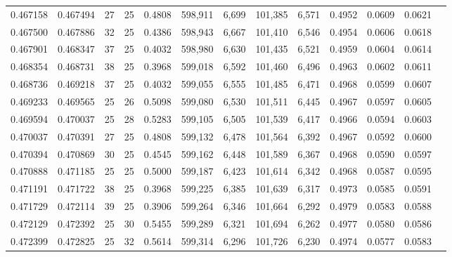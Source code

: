 \begin{tabular}{rrrrrrrrrrrrr}
0.467158 & 0.467494 &    27 &  25 &                                     0.4808 & 598,911 &   6,699 & 101,385 &   6,571 & 0.4952 & 0.0609 & 0.0621 \\
0.467500 & 0.467886 &    32 &  25 &                                     0.4386 & 598,943 &   6,667 & 101,410 &   6,546 & 0.4954 & 0.0606 & 0.0618 \\
0.467901 & 0.468347 &    37 &  25 &                                     0.4032 & 598,980 &   6,630 & 101,435 &   6,521 & 0.4959 & 0.0604 & 0.0614 \\
0.468354 & 0.468731 &    38 &  25 &                                     0.3968 & 599,018 &   6,592 & 101,460 &   6,496 & 0.4963 & 0.0602 & 0.0611 \\
0.468736 & 0.469218 &    37 &  25 &                                     0.4032 & 599,055 &   6,555 & 101,485 &   6,471 & 0.4968 & 0.0599 & 0.0607 \\
0.469233 & 0.469565 &    25 &  26 &                                     0.5098 & 599,080 &   6,530 & 101,511 &   6,445 & 0.4967 & 0.0597 & 0.0605 \\
0.469594 & 0.470037 &    25 &  28 &                                     0.5283 & 599,105 &   6,505 & 101,539 &   6,417 & 0.4966 & 0.0594 & 0.0603 \\
0.470037 & 0.470391 &    27 &  25 &                                     0.4808 & 599,132 &   6,478 & 101,564 &   6,392 & 0.4967 & 0.0592 & 0.0600 \\
0.470394 & 0.470869 &    30 &  25 &                                     0.4545 & 599,162 &   6,448 & 101,589 &   6,367 & 0.4968 & 0.0590 & 0.0597 \\
0.470888 & 0.471185 &    25 &  25 &                                     0.5000 & 599,187 &   6,423 & 101,614 &   6,342 & 0.4968 & 0.0587 & 0.0595 \\
0.471191 & 0.471722 &    38 &  25 &                                     0.3968 & 599,225 &   6,385 & 101,639 &   6,317 & 0.4973 & 0.0585 & 0.0591 \\
0.471729 & 0.472114 &    39 &  25 &                                     0.3906 & 599,264 &   6,346 & 101,664 &   6,292 & 0.4979 & 0.0583 & 0.0588 \\
0.472129 & 0.472392 &    25 &  30 &                                     0.5455 & 599,289 &   6,321 & 101,694 &   6,262 & 0.4977 & 0.0580 & 0.0586 \\
0.472399 & 0.472825 &    25 &  32 &                                     0.5614 & 599,314 &   6,296 & 101,726 &   6,230 & 0.4974 & 0.0577 & 0.0583 \\

\end{tabular}
